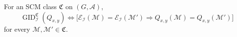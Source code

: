 For an SCM class \(\mathfrak C\) on \((G,\mathcal A)\),
\[
\operatorname{GID}_{\mathcal I}^{\mathfrak C}(Q_{x,y})
\Longleftrightarrow
\bigl[\mathcal E_{\mathcal I}(\mathcal M)=\mathcal E_{\mathcal I}(\mathcal M')
\Longrightarrow Q_{x,y}(\mathcal M)=Q_{x,y}(\mathcal M')\bigr]
\]
for every \(\mathcal M,\mathcal M'\in\mathfrak C\).